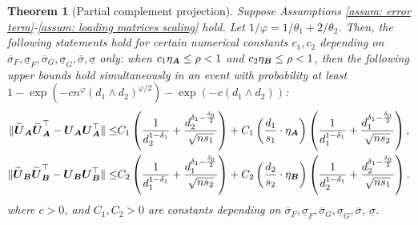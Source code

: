 \documentclass[11pt,letterpaper]{article}
\newtheorem{theorem}{Theorem}[section]
\theoremstyle{definition}
\newcommand{\cano}[1]{\widetilde{\mathbf{#1}}}
\begin{document}
\begin{theorem}[Partial complement projection] 
\label{thm: partial_iteration}
Suppose Assumptions \ref{assum: error term}-\ref{assum: loading matrices scaling} hold. Let $1/\varphi = 1/\theta_1 + 2/\theta_2$. 
Then, the following statements hold for certain numerical constants $c_1,c_2$ depending on $\overline{\sigma}_{F}, \underline{\sigma}_{ F},  \overline{\sigma}_{G}, \underline{\sigma}_{G}, \overline{\sigma}, \underline{\sigma}$ only: when $c_1 \eta_{\boldsymbol{A}}\le \rho <1 $ and $c_2 \eta_{\boldsymbol{B}}\le \rho <1$, then the following upper bounds hold simultaneously in an event with probability at least $1 - \exp(-cn^{\varphi}(d_1 \wedge d_2)^{\varphi/2})- \exp(-c(d_1 \wedge d_2))$:
\begin{align*}
\| \cano{\bU}_{\bA} \cano{\bU}_{\bA}^{\top} - \bU_{\bA} \bU_{\bA}^\top \|
\le & C_1\left(\frac{1}{d_2^{1-\delta_1}} + 
\frac{d_2^{\delta_1-\frac{\delta_{0}}{2}}}
{\sqrt{n s_1}}\right) + C_1 \left(\frac{d_1}{s_1} \cdot \eta_{\bA}\right)  \left(\frac{1}{d_1^{1-\delta_1}} + 
\frac{d_1^{\delta_1-\frac{\delta_{0}}{2}}}
{\sqrt{n s_2}}\right), \\
\| \cano{\bU}_{\bB} \cano{\bU}_{\bB}^{\top} - \bU_{\bB} \bU_{\bB}^\top \|
\le & C_2\left(\frac{1}{d_1^{1-\delta_1}} + 
\frac{d_1^{\delta_1-\frac{\delta_{0}}{2}}}
{\sqrt{n s_2}}\right) + C_2 \left(\frac{d_2}{s_2} \cdot \eta_{\bB}\right)  \left(\frac{1}{d_2^{1-\delta_1}} + 
\frac{d_2^{\delta_1-\frac{\delta_{0}}{2}}}
{\sqrt{n s_1}}\right).
\end{align*}
where $c>0$, and $C_1,C_2>0$ are constants depending on  $\overline{\sigma}_{F}, \underline{\sigma}_{ F}, \overline{\sigma}_{G}, \underline{\sigma}_{G}, \overline{\sigma}$, $\underline{\sigma}$.
\end{theorem}
\end{document}
